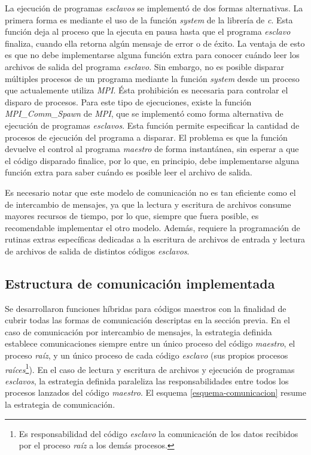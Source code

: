 La ejecución de programas \textit{esclavos} se implementó de dos formas alternativas.
La primera forma es mediante el uso de la función \textit{system} de la librería de \textit{c}.
Esta función deja al proceso que la ejecuta en pausa hasta que el programa \textit{esclavo} finaliza, cuando ella retorna algún mensaje de error o de éxito.
La ventaja de esto es que no debe implementarse alguna función extra para conocer cuándo leer los archivos de salida del programa \textit{esclavo}.
Sin embargo, no es posible disparar múltiples procesos de un programa mediante la función \textit{system} desde un proceso que actualemente utiliza \textit{MPI}.
Ésta prohibición es necesaria para controlar el disparo de procesos.
Para este tipo de ejecuciones, existe la función \textit{MPI\_Comm\_Spawn} de \textit{MPI}, que se implementó como forma alternativa de ejecución de programas \textit{esclavos}.
Esta función permite especificar la cantidad de procesos de ejecución del programa a disparar.
El problema es que la función devuelve el control al programa \textit{maestro} de forma instantánea, sin esperar a que el código disparado finalice,
por lo que, en principio, debe implementarse alguna función extra para saber cuándo es posible leer el archivo de salida.

Es necesario notar que este modelo de comunicación no es tan eficiente como el de intercambio de mensajes,
ya que la lectura y escritura de archivos consume mayores recursos de tiempo, por lo que, siempre que fuera posible, es recomendable implementar el otro modelo.
Además, requiere la programación de rutinas extras específicas dedicadas a la escritura de archivos de entrada y lectura de archivos de salida de distintos códigos \textit{esclavos}.

\subsection*{Estructura de comunicación implementada}
\label{2:estructura}

Se desarrollaron funciones híbridas para códigos maestros con la finalidad de cubrir todas las formas de comunicación descriptas en la sección previa.
En el caso de comunicación por intercambio de mensajes, 
la estrategia definida establece comunicaciones siempre entre un único proceso del código \textit{maestro}, el proceso \textit{raíz},
y un único proceso de cada código \textit{esclavo} (sus propios procesos \textit{raíces}\footnote{
Es responsabilidad del código \textit{esclavo} la comunicación de los datos recibidos por el proceso \textit{raíz} a los demás procesos.
}).
En el caso de lectura y escritura de archivos y ejecución de programas \textit{esclavos},
la estrategia definida paraleliza las responsabilidades entre todos los procesos lanzados del código \textit{maestro}.
El esquema \ref{esquema-comunicacion} resume la estrategia de comunicación.

